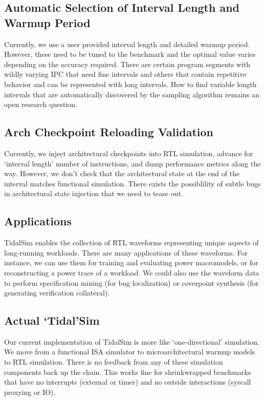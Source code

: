 \documentclass[sigplan,nonacm,10pt]{acmart}
\begin{document}
\subsection{Automatic Selection of Interval Length and Warmup Period}

Currently, we use a user provided interval length and detailed warmup period.
However, these need to be tuned to the benchmark and the optimal value varies depending on the accuracy required.
There are certain program segments with wildly varying IPC that need fine intervals and others that contain repetitive behavior and can be represented with long intervals.
How to find variable length intervals that are automatically discovered by the sampling algorithm remains an open research question.

\subsection{Arch Checkpoint Reloading Validation}

Currently, we inject architectural checkpoints into RTL simulation, advance for `interval length' number of instructions, and dump performance metrics along the way.
However, we don't check that the architectural state at the end of the interval matches functional simulation.
There exists the possiblility of subtle bugs in architectural state injection that we need to tease out.

\subsection{Applications}

TidalSim enables the collection of RTL waveforms representing unique aspects of long-running workloads.
There are many applications of these waveforms.
For instance, we can use them for training and evaluating power macromodels, or for reconstructing a power trace of a workload.
We could also use the waveform data to perform specification mining (for bug localization) or coverpoint synthesis (for generating verification collateral).

\subsection{Actual `Tidal'Sim}

Our current implementation of TidalSim is more like `one-directional' simulation.
We move from a functional ISA simulator to microarchitectural warmup models to RTL simulation.
There is no feedback from any of these simulation components back up the chain.
This works fine for shrinkwrapped benchmarks that have no interrupts (external or timer) and no outside interactions (syscall proxying or IO).
\end{document}

